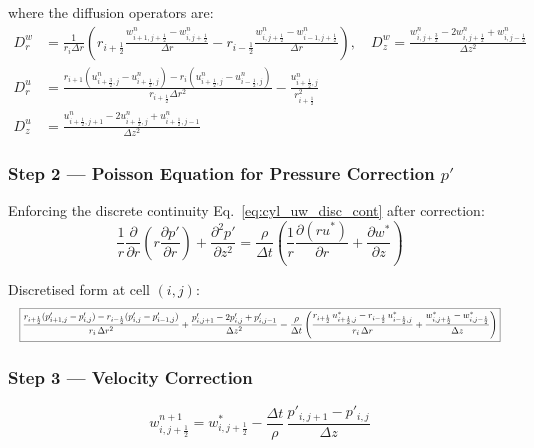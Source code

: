 where the diffusion operators are:
\begin{align}
    D_r^w &= \frac{1}{r_i\Delta r}\!\left(
       r_{i+\frac{1}{2}}\frac{w^n_{i+1,j+\frac{1}{2}}-w^n_{i,j+\frac{1}{2}}}{\Delta r}
      -r_{i-\frac{1}{2}}\frac{w^n_{i,j+\frac{1}{2}}-w^n_{i-1,j+\frac{1}{2}}}{\Delta r}
    \right),\quad
    D_z^w = \frac{w^n_{i,j+\frac{3}{2}}-2w^n_{i,j+\frac{1}{2}}+w^n_{i,j-\frac{1}{2}}}{\Delta z^2}
    \\[4pt]
    D_r^u &= \frac{r_{i+1}(u^n_{i+\frac{3}{2},j}-u^n_{i+\frac{1}{2},j})-r_i(u^n_{i+\frac{1}{2},j}-u^n_{i-\frac{1}{2},j})}{r_{i+\frac{1}{2}}\Delta r^2}
    - \frac{u^n_{i+\frac{1}{2},j}}{r_{i+\frac{1}{2}}^2}
    \\[4pt]
    D_z^u &= \frac{u^n_{i+\frac{1}{2},j+1}-2u^n_{i+\frac{1}{2},j}+u^n_{i+\frac{1}{2},j-1}}{\Delta z^2}
\end{align}

\subsubsection{Step 2 --- Poisson Equation for Pressure Correction $p'$}

Enforcing the discrete continuity Eq.~\eqref{eq:cyl_uw_disc_cont} after correction:
\begin{equation}
    \frac{1}{r}\frac{\partial}{\partial r}\!\left(r\frac{\partial p'}{\partial r}\right)
    +\frac{\partial^2 p'}{\partial z^2}
    = \frac{\rho}{\Delta t}\left(
       \frac{1}{r}\frac{\partial(ru^*)}{\partial r}+\frac{\partial w^*}{\partial z}
      \right)
\end{equation}

Discretised form at cell $(i,j)$:
\begin{equation}
\resizebox{\textwidth}{!}{$\displaystyle
\boxed{
\frac{r_{i+\frac{1}{2}}(p'_{i+1,j}-p'_{i,j}) - r_{i-\frac{1}{2}}(p'_{i,j}-p'_{i-1,j})}{r_i\,\Delta r^2}
+\frac{p'_{i,j+1}-2p'_{i,j}+p'_{i,j-1}}{\Delta z^2}
= \frac{\rho}{\Delta t}\left(
  \frac{r_{i+\frac{1}{2}}\,u^*_{i+\frac{1}{2},j}-r_{i-\frac{1}{2}}\,u^*_{i-\frac{1}{2},j}}{r_i\,\Delta r}
  +\frac{w^*_{i,j+\frac{1}{2}}-w^*_{i,j-\frac{1}{2}}}{\Delta z}
\right)
}$}
\label{eq:cyl_uw_disc_poisson}
\end{equation}

\subsubsection{Step 3 --- Velocity Correction}

\begin{equation}
\boxed{
    w^{n+1}_{i,j+\frac{1}{2}} = w^*_{i,j+\frac{1}{2}}
    - \frac{\Delta t}{\rho}\,\frac{p'_{i,j+1}-p'_{i,j}}{\Delta z}
}
\label{eq:cyl_uw_corr_w}
\end{equation}

